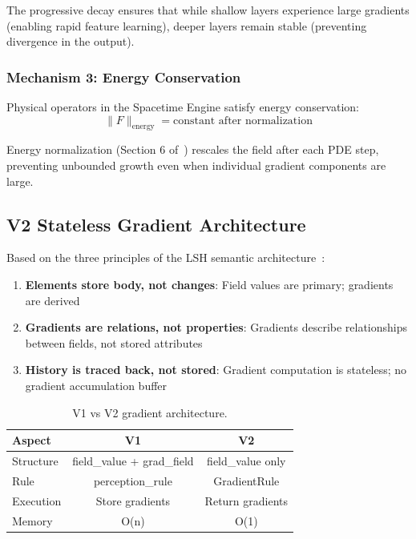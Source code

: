 \documentclass{article}
\begin{document}
The progressive decay ensures that while shallow layers experience large gradients (enabling rapid feature learning), deeper layers remain stable (preventing divergence in the output).

\subsubsection{Mechanism 3: Energy Conservation}

Physical operators in the Spacetime Engine satisfy energy conservation:
\begin{equation}
\|F\|_{\text{energy}} = \text{constant after normalization}
\end{equation}

Energy normalization (Section 6 of~\cite{lsh-sfa}) rescales the field after each PDE step, preventing unbounded growth even when individual gradient components are large.

\subsection{V2 Stateless Gradient Architecture}

Based on the three principles of the LSH semantic architecture~\cite{lsh-three-layer}:

\begin{enumerate}
\item \textbf{Elements store body, not changes}: Field values are primary; gradients are derived
\item \textbf{Gradients are relations, not properties}: Gradients describe relationships between fields, not stored attributes
\item \textbf{History is traced back, not stored}: Gradient computation is stateless; no gradient accumulation buffer
\end{enumerate}

\begin{table}[h]
\centering
\caption{V1 vs V2 gradient architecture.}
\label{tab:v1v2}
\begin{tabular}{lcc}
\toprule
\textbf{Aspect} & \textbf{V1} & \textbf{V2} \\
\midrule
Structure & field\_value + grad\_field & field\_value only \\
Rule & perception\_rule & GradientRule \\
Execution & Store gradients & Return gradients \\
Memory & O(n) & O(1) \\
\bottomrule
\end{tabular}
\end{table}
\end{document}
